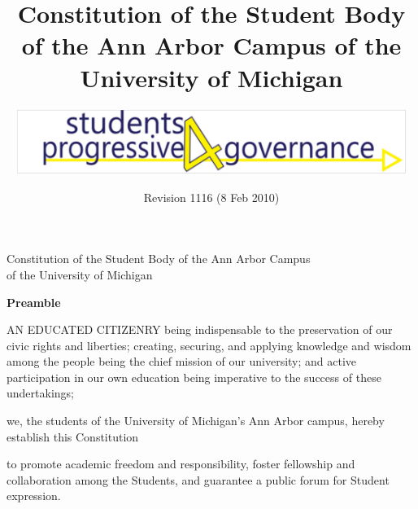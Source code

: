 \documentclass{constitution}
\begin{document}
	\renewcommand{\thepage}{\roman{page}}
	\title{Constitution of the Student Body of the Ann Arbor Campus of the University of Michigan}
	\author{\includegraphics[width=5in]{S4PGlogo}}
	\date{Revision 1116 (8 Feb 2010)}
	\maketitle
	\tableofcontents
	\newpage

	\renewcommand{\thepage}{\arabic{page}}
	\setcounter{page}{1}
	\pagestyle{fancy}
	\headheight 35pt
	\linenumbers
	
	\begin{center}
		\Large Constitution of the Student Body of the Ann Arbor Campus\\ of the University of Michigan
	\end{center}
	
	\begin{center}
		\bfseries Preamble
	\end{center}

	AN EDUCATED CITIZENRY being indispensable to the preservation of our civic rights and liberties; creating, securing, and applying knowledge and wisdom among the people being the chief mission of our university; and active participation in our own education being imperative to the success of these undertakings;

	    we, the students of the University of Michigan's Ann Arbor campus, hereby establish this Constitution

	to promote academic freedom and responsibility, foster fellowship and collaboration among the Students, and guarantee a public forum for Student expression.
	

	

	
	
	
	
	
	
	
	
	
	

	
	
	
\end{document}
